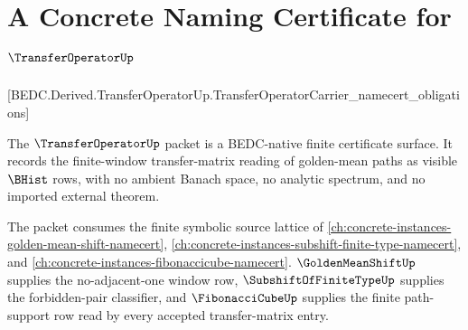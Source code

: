 \chapter{A Concrete Naming Certificate for $\TransferOperatorUp$}
\label{ch:concrete-instances-transferoperator-namecert}

[BEDC.Derived.TransferOperatorUp.TransferOperatorCarrier\_namecert\_obligations]

The $\TransferOperatorUp$ packet is a BEDC-native finite certificate surface. It records the finite-window transfer-matrix reading of golden-mean paths as visible $\BHist$ rows, with no ambient Banach space, no analytic spectrum, and no imported external theorem.

The packet consumes the finite symbolic source lattice of \autoref{ch:concrete-instances-golden-mean-shift-namecert}, \autoref{ch:concrete-instances-subshift-finite-type-namecert}, and \autoref{ch:concrete-instances-fibonaccicube-namecert}. $\GoldenMeanShiftUp$ supplies the no-adjacent-one window row, $\SubshiftOfFiniteTypeUp$ supplies the forbidden-pair classifier, and $\FibonacciCubeUp$ supplies the finite path-support row read by every accepted transfer-matrix entry.

